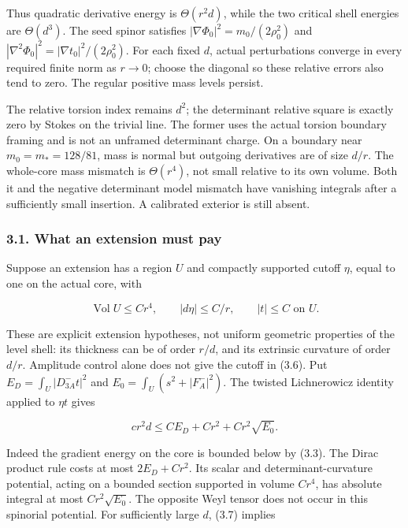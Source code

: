 \documentclass[
  11pt,
]{article}
\begin{document}
Thus quadratic derivative energy is \(\Theta(r^2d)\), while the two
critical shell energies are \(\Theta(d^3)\). The seed spinor satisfies
\(|\nabla\Phi_0|^2=m_0/(2\rho_0^2)\) and
\(|\nabla^2\Phi_0|^2=|\nabla t_0|^2/(2\rho_0^2)\). For each fixed \(d\),
actual perturbations converge in every required finite norm as
\(r\to0\); choose the diagonal so these relative errors also tend to
zero. The regular positive mass levels persist.

The relative torsion index remains \(d^2\); the determinant relative
square is exactly zero by Stokes on the trivial line. The former uses
the actual torsion boundary framing and is not an unframed determinant
charge. On a boundary near \(m_0=m_*=128/81\), mass is normal but
outgoing derivatives are of size \(d/r\). The whole-core mass mismatch
is \(\Theta(r^4)\), not small relative to its own volume. Both it and
the negative determinant model mismatch have vanishing integrals after a
sufficiently small insertion. A calibrated exterior is still absent.

\hypertarget{what-an-extension-must-pay}{%
\subsubsection{3.1. What an extension must
pay}\label{what-an-extension-must-pay}}

Suppose an extension has a region \(U\) and compactly supported cutoff
\(\eta\), equal to one on the actual core, with

\[
 \operatorname{Vol}U\le C r^4,\qquad |d\eta|\le C/r,
 \qquad |t|\le C \text{ on }U.
 \tag{3.6}
\]

These are explicit extension hypotheses, not uniform geometric
properties of the level shell: its thickness can be of order \(r/d\),
and its extrinsic curvature of order \(d/r\). Amplitude control alone
does not give the cutoff in (3.6). Put \(E_D=\int_U|D^-_{3A}t|^2\) and
\(E_0=\int_U(s^2+|F_A^-|^2)\). The twisted Lichnerowicz identity applied
to \(\eta t\) gives

\[
 \boxed{c r^2d\le C E_D+C r^2+C r^2\sqrt{E_0}.}
 \tag{3.7}
\]

Indeed the gradient energy on the core is bounded below by (3.3). The
Dirac product rule costs at most \(2E_D+Cr^2\). Its scalar and
determinant-curvature potential, acting on a bounded section supported
in volume \(Cr^4\), has absolute integral at most \(Cr^2\sqrt{E_0}\).
The opposite Weyl tensor does not occur in this spinorial potential. For
sufficiently large \(d\), (3.7) implies
\end{document}
